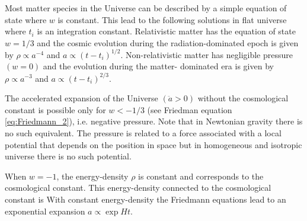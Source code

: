 Most matter species in the Universe can be described by a simple equation of state
where $w$ is constant. This lead to the following solutions in flat universe
where $t_i$ is an integration constant. Relativistic matter has the equation of state $w=1/3$ and the cosmic evolution during the radiation-dominated epoch is given by $\rho\propto a^{-4}$ and $a\propto(t-t_i)^{1/2}$. Non-relativistic matter has negligible pressure $(w=0)$ and the evolution during the matter- dominated era is given by $\rho\propto a^{-3}$ and $a\propto(t-t_i)^{2/3}$.

The accelerated expansion of the Universe $(\ddot a>0)$ without the cosmological constant is possible only for $w<-1/3$ (see Friedman equation \eqref{eq:Friedmann_2}), i.e. negative pressure. Note that in Newtonian gravity there is no such equivalent. The pressure is related to a force associated with a local potential that depends on the position in space but in homogeneous and isotropic universe there is no such potential.

When $w=-1$, the energy-density $\rho$ is constant and corresponds to the cosmological constant. This energy-density connected to the cosmological constant is
With constant energy-density the Friedmann equations lead to an exponential expansion $a\propto\exp{Ht}$.
